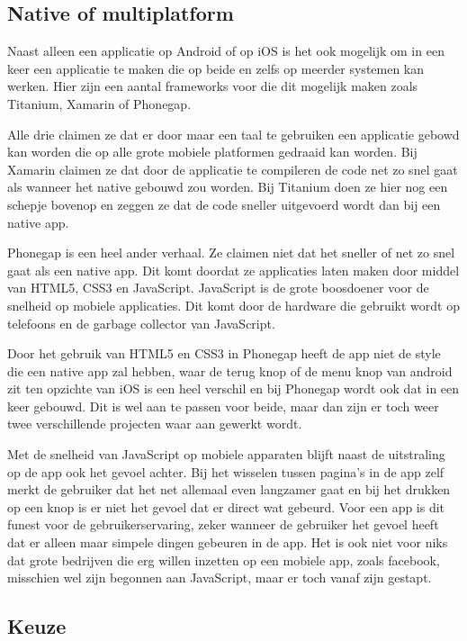 \documentclass[a4paper,11pt,oneside]{report}
\begin{document}
\subsection{Native of multiplatform}
Naast alleen een applicatie op Android of op iOS is het ook mogelijk om in een keer een applicatie te maken die op beide en zelfs op meerder systemen kan werken. Hier zijn een aantal frameworks voor die dit mogelijk maken zoals Titanium, Xamarin of Phonegap. 

Alle drie claimen ze dat er door maar een taal te gebruiken een applicatie gebowd kan worden die op alle grote mobiele platformen gedraaid kan worden. Bij Xamarin claimen ze dat door de applicatie te compileren de code net zo snel gaat als wanneer het native gebouwd zou worden. Bij Titanium doen ze hier nog een schepje bovenop en zeggen ze dat de code sneller uitgevoerd wordt dan bij een native app.

Phonegap is een heel ander verhaal. Ze claimen niet dat het sneller of net zo snel gaat als een native app. Dit komt doordat ze applicaties laten maken door middel van HTML5, CSS3 en JavaScript. JavaScript is de grote boosdoener voor de snelheid op mobiele applicaties. Dit komt door de hardware die gebruikt wordt op telefoons en de garbage collector van JavaScript.

Door het gebruik van HTML5 en CSS3 in Phonegap heeft de app niet de style die een native app zal hebben, waar de terug knop of de menu knop van android zit ten opzichte van iOS is een heel verschil en bij Phonegap wordt ook dat in een keer gebouwd. Dit is wel aan te passen voor beide, maar dan zijn er toch weer twee verschillende projecten waar aan gewerkt wordt. 

Met de snelheid van JavaScript op mobiele apparaten blijft naast de uitstraling op de app ook het gevoel achter. Bij het wisselen tussen pagina's in de app zelf merkt de gebruiker dat het net allemaal even langzamer gaat en bij het drukken op een knop is er niet het gevoel dat er direct wat gebeurd. Voor een app is dit funest voor de gebruikerservaring, zeker wanneer de gebruiker het gevoel heeft dat er alleen maar simpele dingen gebeuren in de app. Het is ook niet voor niks dat grote bedrijven die erg willen inzetten op een mobiele app, zoals facebook, misschien wel zijn begonnen aan JavaScript, maar er toch vanaf zijn gestapt.



\subsection{Keuze}
\end{document}
